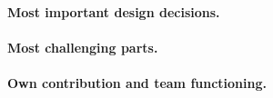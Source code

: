 \paragraph{Most important design decisions.} 
\paragraph{Most challenging parts.} 
\paragraph{Own contribution and team functioning.} 
